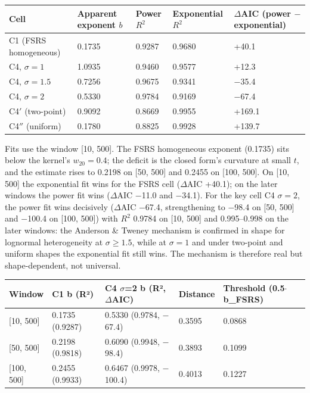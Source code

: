 \documentclass[11pt]{article}
\begin{document}
\begin{table}[htbp]
\centering
\begin{tabular}{lllll}
\toprule
\textbf{Cell} & \textbf{Apparent exponent $b$} & \textbf{Power $R^2$} & \textbf{Exponential $R^2$} & \textbf{$\Delta$AIC (power $-$ exponential)} \\
\midrule
C1 (FSRS homogeneous) & 0.1735 & 0.9287 & 0.9680 & +40.1 \\
C4, $\sigma=1$ & 1.0935 & 0.9460 & 0.9577 & +12.3 \\
C4, $\sigma=1.5$ & 0.7256 & 0.9675 & 0.9341 & $-$35.4 \\
C4, $\sigma=2$ & 0.5330 & 0.9784 & 0.9169 & $-$67.4 \\
C4$'$ (two-point) & 0.9092 & 0.8669 & 0.9955 & +169.1 \\
C4$''$ (uniform) & 0.1780 & 0.8825 & 0.9928 & +139.7 \\
\bottomrule
\end{tabular}
\end{table}

Fits use the window [10, 500]. The FSRS homogeneous exponent (0.1735) sits below the kernel's $w_{20} = 0.4$; the deficit is the closed form's curvature at small $t$, and the estimate rises to 0.2198 on [50, 500] and 0.2455 on [100, 500]. On [10, 500] the exponential fit wins for the FSRS cell ($\Delta$AIC +40.1); on the later windows the power fit wins ($\Delta$AIC $-$11.0 and $-$34.1). For the key cell C4 $\sigma=2$, the power fit wins decisively ($\Delta$AIC $-$67.4, strengthening to $-$98.4 on [50, 500] and $-$100.4 on [100, 500]) with $R^2$ 0.9784 on [10, 500] and 0.995--0.998 on the later windows: the Anderson \& Tweney mechanism is confirmed in shape for lognormal heterogeneity at $\sigma \geq 1.5$, while at $\sigma=1$ and under two-point and uniform shapes the exponential fit still wins. The mechanism is therefore real but shape-dependent, not universal.

\begin{table}[htbp]
\centering
\begin{tabular}{lllll}
\toprule
\textbf{Window} & \textbf{C1 b (R²)} & \textbf{C4 $\sigma$=2 b (R², $\Delta$AIC)} & \textbf{Distance} & \textbf{Threshold (0.5$\cdot$b\_FSRS)} \\
\midrule
{}[10, 500] & 0.1735 (0.9287) & 0.5330 (0.9784, $-$67.4) & 0.3595 & 0.0868 \\
{}[50, 500] & 0.2198 (0.9818) & 0.6090 (0.9948, $-$98.4) & 0.3893 & 0.1099 \\
{}[100, 500] & 0.2455 (0.9933) & 0.6467 (0.9978, $-$100.4) & 0.4013 & 0.1227 \\
\bottomrule
\end{tabular}
\end{table}
\end{document}
